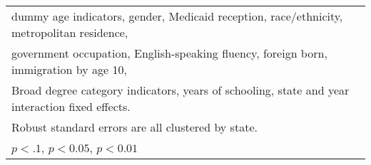 \begin{table}[htbp]
\begin{tabular}{l*{3}{c}}
\multicolumn{4}{l}{\footnotesize dummy age indicators, gender, Medicaid reception, race/ethnicity, metropolitan residence,}\\
\multicolumn{4}{l}{\footnotesize government occupation, English-speaking fluency, foreign born, immigration by age 10,}\\
\multicolumn{4}{l}{\footnotesize Broad degree category indicators, years of schooling, state and year interaction fixed effects.}\\
\multicolumn{4}{l}{\footnotesize Robust standard errors are all clustered by state.}\\
\multicolumn{4}{l}{\footnotesize \sym{*} \(p<.1\), \sym{**} \(p<0.05\), \sym{***} \(p<0.01\)}\\
\end{tabular}
\end{table}
